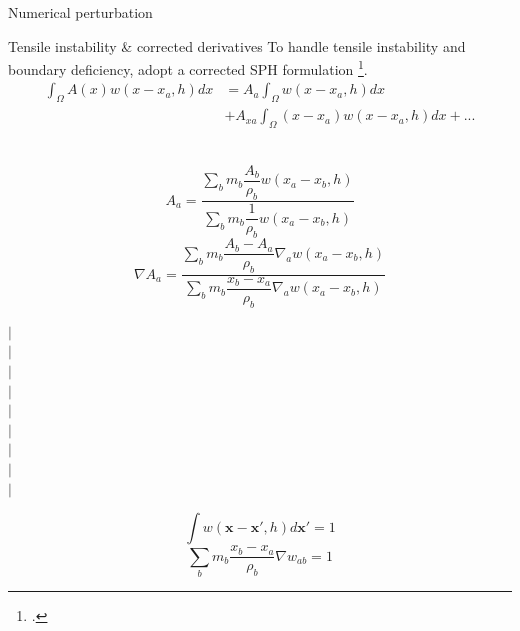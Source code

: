 \documentclass{beamer}
\begin{document}
\begin{frame}{Numerical perturbation}
\begin{minipage}{0.42 \textwidth}
\end{minipage}
\end{frame}

\begin{frame}{Tensile instability \& corrected derivatives}
To handle tensile instability and boundary deficiency, adopt a corrected SPH formulation \footcite{chen1999improvement}.
\begin{equation}
\begin{split}
\int_{\Omega} A\left(x\right) w\left(x- x_a, h\right) dx &= 
A_a \int_{\Omega} w\left(x - x_a, h\right) dx \\  & +A_{xa} \int_{\Omega} \left(x-x_a\right) w\left(x - x_a, h\right) dx +...
\end{split}
\end{equation}
\\
\noindent
\begin{minipage}{0.99 \textwidth}
\begin{minipage}{0.60 \textwidth}
\begin{equation}
A_a = \frac{\sum_b m_b \dfrac{A_b}{\rho_b} w\left(x_a-x_b, h\right)}{\sum_b m_b \dfrac{1}{\rho_b} w\left(x_a-x_b, h\right)}
\label{eq:CSP-function-approximation-1d}
\end{equation}
\begin{equation}
\nabla A_a = \frac{\sum_b m_b \dfrac{A_b - A_a}{\rho_b} \nabla_a w\left(x_a-x_b, h\right)}{\sum_b m_b \dfrac{x_b - x_a}{\rho_b} \nabla_a w\left(x_a-x_b, h\right)}
\end{equation}
\end{minipage}
\begin{minipage}{.01\textwidth}
$\vert$\\
$\vert$\\
$\vert$\\
$\vert$\\
$\vert$\\
$\vert$\\
$\vert$\\
$\vert$\\
$\vert$\\
\end{minipage}
\begin{minipage}{0.37 \textwidth}
\begin{equation}
\int	 w\left(\textbf{x}-\textbf{x}\prime, h\right) d\textbf{x}\prime = 1
\label{eq:SPH-kernel-normalization-prop}
\end{equation}
\begin{equation}
\sum_b m_b \dfrac{x_b - x_a}{\rho_b} \nabla w_{ab} = 1 
\label{eq:SPH-kernel-normalization-prop}
\end{equation}
\end{minipage}
%
\end{minipage}
%
\end{frame}
\end{document}
